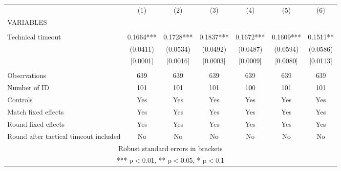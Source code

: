 \documentclass[]{article}
\begin{document}
\begin{tabular}{lcccccc} \hline
 & (1) & (2) & (3) & (4) & (5) & (6) \\
VARIABLES &  &  &  &  &  &  \\ \hline
 &  &  &  &  &  &  \\
Technical timeout & 0.1664*** & 0.1728*** & 0.1837*** & 0.1672*** & 0.1609*** & 0.1511** \\
 & (0.0411) & (0.0534) & (0.0492) & (0.0487) & (0.0594) & (0.0586) \\
 & [0.0001] & [0.0016] & [0.0003] & [0.0009] & [0.0080] & [0.0113] \\
 &  &  &  &  &  &  \\
Observations & 639 & 639 & 639 & 639 & 639 & 639 \\
Number of ID & 101 & 101 & 101 & 100 & 101 & 101 \\
Controls & Yes & Yes & Yes & Yes & Yes & Yes \\
Match fixed effects & Yes & Yes & Yes & Yes & Yes & Yes \\
Round fixed effects & Yes & Yes & Yes & Yes & Yes & Yes \\
 Round after tactical timeout included & No & No & No & No & No & No \\ \hline
\multicolumn{7}{c}{ Robust standard errors in brackets} \\
\multicolumn{7}{c}{ *** p$<$0.01, ** p$<$0.05, * p$<$0.1} \\
\end{tabular}
\end{document}
